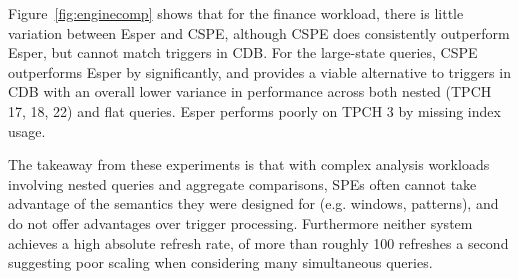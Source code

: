 Figure~\ref{fig:enginecomp} shows that for the finance workload, there is little
variation between Esper and CSPE, although CSPE does consistently outperform
Esper, but cannot match triggers in CDB. For the large-state queries, CSPE
outperforms Esper by significantly, and provides a viable alternative to
triggers in CDB with an overall lower variance in performance across both
nested (TPCH 17, 18, 22) and flat queries. Esper performs poorly on
TPCH 3 by missing index usage.

The takeaway from these experiments is that with complex analysis workloads
involving nested queries and aggregate comparisons, SPEs often cannot take
advantage of the semantics they were designed for (e.g. windows, patterns), and
do not offer advantages over trigger processing. Furthermore neither system
achieves a high absolute refresh rate, of more than roughly 100 refreshes a
second suggesting poor scaling when considering many simultaneous queries.
